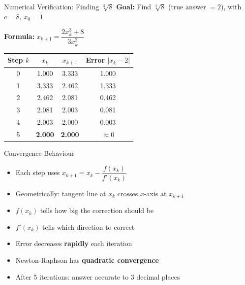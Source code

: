 \documentclass{beamer}
\begin{document}
\begin{frame}{Numerical Verification: Finding $\sqrt[3]{8}$}
\textbf{Goal:} Find $\sqrt[3]{8}$ (true answer $= 2$), with $c = 8$, $x_0 = 1$

\vspace{0.3cm}

\textbf{Formula:} $x_{k+1} = \dfrac{2x_k^3 + 8}{3x_k^2}$

\vspace{0.3cm}

\begin{center}
\renewcommand{\arraystretch}{1.5}
\begin{tabular}{cccc}
\toprule
\textbf{Step $k$} & $x_k$ & $x_{k+1}$ & Error $|x_k - 2|$ \\
\midrule
0 & 1.000 & 3.333 & 1.000 \\
1 & 3.333 & 2.462 & 1.333 \\
2 & 2.462 & 2.081 & 0.462 \\
3 & 2.081 & 2.003 & 0.081 \\
4 & 2.003 & 2.000 & 0.003 \\
5 & \textbf{2.000} & \textbf{2.000} & $\approx 0$ \\
\bottomrule
\end{tabular}
\end{center}

\end{frame}

\begin{frame}{Convergence Behaviour}
\begin{itemize}
    \item Each step uses $x_{k+1} = x_k - \dfrac{f(x_k)}{f'(x_k)}$
    \item Geometrically: tangent line at $x_k$ crosses $x$-axis at $x_{k+1}$
    \item $f(x_k)$ tells how big the correction should be
    \item $f'(x_k)$ tells which direction to correct
\end{itemize}

\vspace{0.4cm}

\begin{itemize}
    \item Error decreases \textbf{rapidly} each iteration
    \item Newton-Raphson has \textbf{quadratic convergence}
    \item After 5 iterations: answer accurate to 3 decimal places
\end{itemize}
\end{frame}
\end{document}
